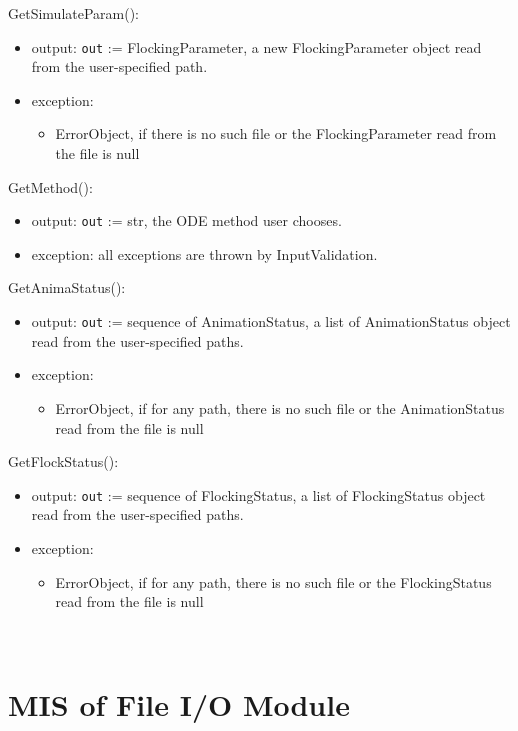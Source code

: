 \documentclass[12pt, titlepage]{article}
\begin{document}
\noindent GetSimulateParam():
\begin{itemize}
\item output: \texttt{out} := FlockingParameter, a new FlockingParameter object 
read from the user-specified path.
\item exception: 
\begin{itemize}
    \item ErrorObject, if there is no such file or the FlockingParameter read 
    from the file is null
\end{itemize}
\end{itemize}

\noindent GetMethod():
\begin{itemize}
\item output: \texttt{out} := str, the ODE method user chooses.
\item exception: all exceptions are thrown by InputValidation.
\end{itemize}

\noindent GetAnimaStatus():
\begin{itemize}
\item output: \texttt{out} := sequence of AnimationStatus, a list of AnimationStatus object 
read from the user-specified paths.
\item exception: 
\begin{itemize}
    \item ErrorObject, if for any path, there is no such file or the 
    AnimationStatus read from the file is null
\end{itemize}
\end{itemize}

\noindent GetFlockStatus():
\begin{itemize}
\item output: \texttt{out} := sequence of FlockingStatus, a list of FlockingStatus object 
read from the user-specified paths.
\item exception: 
\begin{itemize}
    \item ErrorObject, if for any path, there is no such file or the 
    FlockingStatus read from the file is null
\end{itemize}
\end{itemize}

~\newpage

\section{MIS of File I/O Module} \label{mFile}
\end{document}
